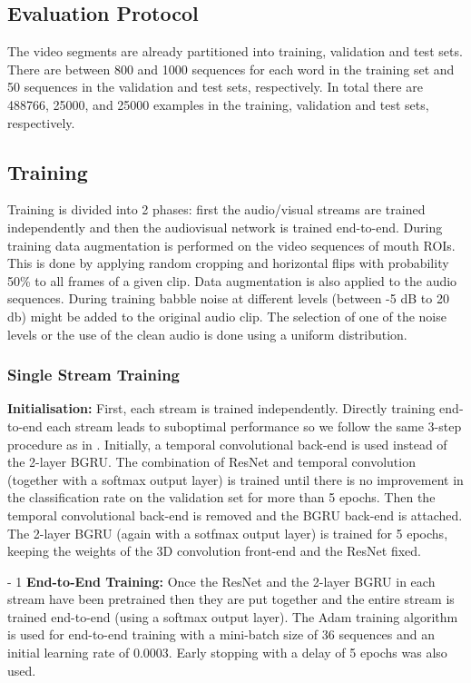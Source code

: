 \documentclass{article}
\begin{document}
\subsection{Evaluation Protocol}


The video segments are already partitioned into training, validation and test sets. There are between 800 and 1000 sequences for each word in the training set and 50 sequences in the validation and test sets, respectively. In total there are 488766, 25000, and 25000 examples in the training, validation and test sets, respectively.


\subsection{Training}
\label{ssec:training}

Training is divided into 2 phases: first the audio/visual streams are trained independently and then the audiovisual network is trained end-to-end. During training data augmentation is performed on the video sequences of mouth ROIs. This is done by applying random cropping and horizontal flips with probability 50\% to all frames of a given clip. Data augmentation is also applied to the audio sequences. During training babble noise at different levels (between -5 dB to 20 db) might be added to the original audio clip. The selection of one of the noise levels or the use of the clean audio is done using a uniform distribution.  


\subsubsection{Single Stream Training} 

\textbf{Initialisation:} First, each stream is trained independently. Directly
training end-to-end each stream leads to suboptimal performance so we follow the same 3-step procedure as in \cite{stafylakis2017combining}.
Initially, a temporal convolutional back-end is used instead of the 2-layer BGRU. The combination of ResNet and temporal convolution (together with a softmax output layer) is trained until there is no improvement in the classification rate on the validation set for more than 5 epochs. Then the temporal convolutional back-end is removed and the BGRU back-end is
attached. The 2-layer BGRU (again with a sotfmax output layer) is trained for 5 epochs, keeping the weights of the 3D convolution front-end and the ResNet fixed. 

\looseness - 1
\noindent
\textbf{End-to-End Training:} Once the ResNet and the 2-layer BGRU in each stream have been pretrained then they are put together and the entire stream is trained end-to-end (using a softmax output layer).
The Adam training algorithm \cite{kingma2014adam} is used for end-to-end training with a mini-batch size of 36 sequences and an initial learning rate of 0.0003. Early stopping with a delay of 5 epochs was also used.
\end{document}
